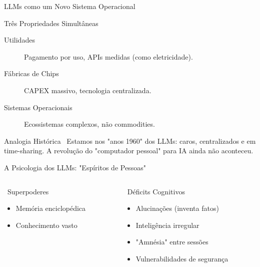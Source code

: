 \documentclass[aspectratio=169,12pt]{beamer}
\begin{document}
\begin{frame}{LLMs como um Novo Sistema Operacional}
    \begin{block}{Três Propriedades Simultâneas}
        \begin{description}
            \item[\textcolor{accent}{\faBolt} Utilidades] Pagamento por uso, APIs medidas (como eletricidade).
            \item[\textcolor{secondary}{\faMicrochip} Fábricas de Chips] CAPEX massivo, tecnologia centralizada.
            \item[\textcolor{success}{\faDesktop} Sistemas Operacionais] Ecossistemas complexos, não commodities.
        \end{description}
    \end{block}

    \begin{alertblock}{Analogia Histórica}
        \faCalendar\, Estamos nos "anos 1960" dos LLMs: caros, centralizados e em time-sharing. A revolução do "computador pessoal" para IA ainda não aconteceu.
    \end{alertblock}
\end{frame}

\begin{frame}{A Psicologia dos LLMs: "Espíritos de Pessoas"}
    \begin{columns}
        \begin{column}{0.5\textwidth}
            \begin{exampleblock}{\faStar\, Superpoderes}
                \begin{itemize}
                    \item Memória enciclopédica
                    \item Conhecimento vasto
                \end{itemize}
            \end{exampleblock}
        \end{column}
        \begin{column}{0.5\textwidth}
            \begin{alertblock}{\faBug\, Déficits Cognitivos}
                \begin{itemize}
                    \item Alucinações (inventa fatos)
                    \item Inteligência irregular
                    \item "Amnésia" entre sessões
                    \item Vulnerabilidades de segurança
                \end{itemize}
            \end{alertblock}
        \end{column}
    \end{columns}
\end{frame}
\end{document}

